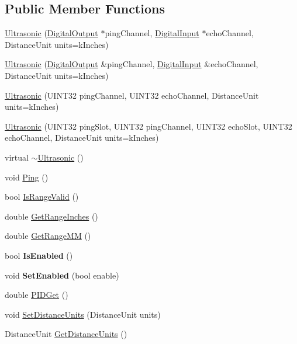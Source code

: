 \subsection*{\-Public \-Member \-Functions}
\begin{DoxyCompactItemize}
\item 
\hyperlink{classUltrasonic_aefd7583faa56df3a6c1a4fc38d3752e2}{\-Ultrasonic} (\hyperlink{classDigitalOutput}{\-Digital\-Output} $\ast$ping\-Channel, \hyperlink{classDigitalInput}{\-Digital\-Input} $\ast$echo\-Channel, \-Distance\-Unit units=k\-Inches)
\item 
\hyperlink{classUltrasonic_a5089d8a662c2b13f9bb15d6d36f11e36}{\-Ultrasonic} (\hyperlink{classDigitalOutput}{\-Digital\-Output} \&ping\-Channel, \hyperlink{classDigitalInput}{\-Digital\-Input} \&echo\-Channel, \-Distance\-Unit units=k\-Inches)
\item 
\hyperlink{classUltrasonic_a2c89013dc7050dc8a99f6eaf9b664482}{\-Ultrasonic} (\-U\-I\-N\-T32 ping\-Channel, \-U\-I\-N\-T32 echo\-Channel, \-Distance\-Unit units=k\-Inches)
\item 
\hyperlink{classUltrasonic_a890f716bd320f15bfa15c9c376f06b77}{\-Ultrasonic} (\-U\-I\-N\-T32 ping\-Slot, \-U\-I\-N\-T32 ping\-Channel, \-U\-I\-N\-T32 echo\-Slot, \-U\-I\-N\-T32 echo\-Channel, \-Distance\-Unit units=k\-Inches)
\item 
virtual \hyperlink{classUltrasonic_ab5066b2bfeac723140c18b9f8340abad}{$\sim$\-Ultrasonic} ()
\item 
void \hyperlink{classUltrasonic_aff9a83272ddaf8579ce2434e20f0b965}{\-Ping} ()
\item 
bool \hyperlink{classUltrasonic_a765c830f4ff4c68e83de2f14d43fa54c}{\-Is\-Range\-Valid} ()
\item 
double \hyperlink{classUltrasonic_a73c80fe92b2085107714c6a110d90d70}{\-Get\-Range\-Inches} ()
\item 
double \hyperlink{classUltrasonic_af35c9a3273f1ffcf0eb17308d986d7c0}{\-Get\-Range\-M\-M} ()
\item 
\hypertarget{classUltrasonic_a5ff4ef91ebe488a3a30658b23fd846fa}{bool {\bfseries \-Is\-Enabled} ()}\label{classUltrasonic_a5ff4ef91ebe488a3a30658b23fd846fa}

\item 
\hypertarget{classUltrasonic_aa3e3a0dc833cc2549026e6d3c3d7fe47}{void {\bfseries \-Set\-Enabled} (bool enable)}\label{classUltrasonic_aa3e3a0dc833cc2549026e6d3c3d7fe47}

\item 
double \hyperlink{classUltrasonic_a8ec6de749ccd7e93b28735e9cc6d0b22}{\-P\-I\-D\-Get} ()
\item 
void \hyperlink{classUltrasonic_a0fc0d0787d943c45e04194727addaac0}{\-Set\-Distance\-Units} (\-Distance\-Unit units)
\item 
\-Distance\-Unit \hyperlink{classUltrasonic_aac979c8a612ef86912989a782f7dd634}{\-Get\-Distance\-Units} ()
\end{DoxyCompactItemize}
